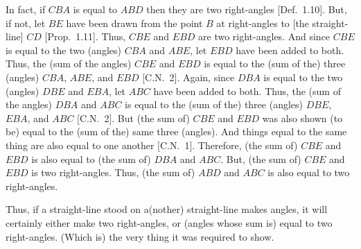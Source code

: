 \begin{Parallel}{}{}
{In fact, if $CBA$ is equal to $ABD$ then they are two right-angles [Def.~1.10].
But, if not, let $BE$ have been drawn from the point $B$ at right-angles to [the
straight-line] $CD$ [Prop.~1.11]. Thus, $CBE$ and $EBD$ are two right-angles.
And since $CBE$ is equal to the two (angles) $CBA$ and $ABE$, let $EBD$ have been added
to both. Thus, the (sum of the angles) $CBE$ and $EBD$ is equal to the  (sum of the) three (angles)
$CBA$, $ABE$, and $EBD$ [C.N.~2]. Again, since $DBA$ is equal to the two (angles) $DBE$
and $EBA$, let $ABC$ have been added to both. Thus, the (sum of the angles) $DBA$ and $ABC$ is
equal to the (sum of the) three (angles) $DBE$, $EBA$, and $ABC$ [C.N.~2]. But (the sum of) $CBE$ and $EBD$ was
also shown (to be) equal to the (sum of the) same three (angles). And things equal to the
same thing are also equal to one another [C.N.~1]. Therefore, 
(the sum of) $CBE$ and
$EBD$ is also equal to (the sum of) $DBA$ and $ABC$. But, (the sum of) $CBE$ and $EBD$ is two
right-angles. Thus, (the sum of) $ABD$ and $ABC$ is also equal to two right-angles.

Thus, if a straight-line stood on a(nother)  straight-line makes angles,
it will certainly either make two right-angles, or (angles whose sum is) equal
to two right-angles. (Which is) the very thing it was required to show.}
\end{Parallel}~\\


